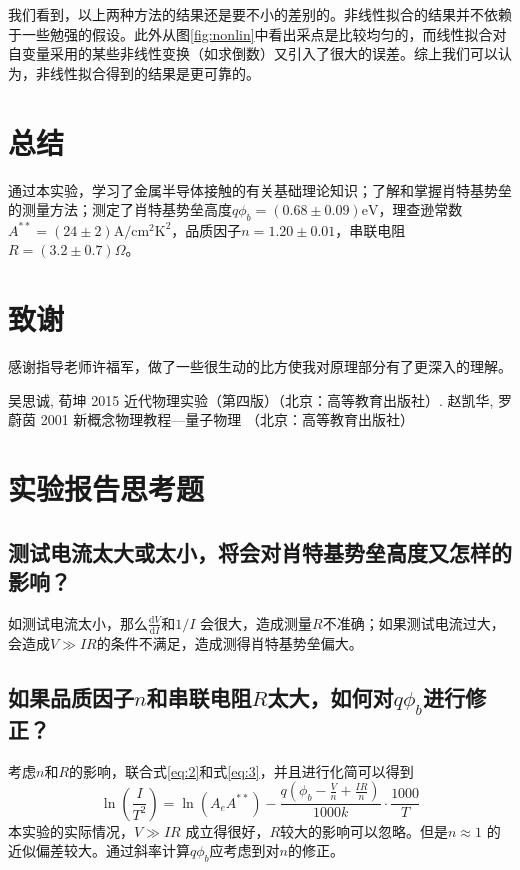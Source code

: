 \documentclass[aps,pre,12pt,preprint,onecolumn,showpacs,showkeys]{revtex4-1}
\def \d {\mathrm d}
\begin{document}
        我们看到，以上两种方法的结果还是要不小的差别的。非线性拟合的结果并不依赖于一些勉强的假设。此外从图\ref{fig:nonlin}中看出采点是比较均匀的，而线性拟合对自变量采用的某些非线性变换（如求倒数）又引入了很大的误差。综上我们可以认为，非线性拟合得到的结果是更可靠的。

\section{总结}
    通过本实验，学习了金属半导体接触的有关基础理论知识；了解和掌握肖特基势垒的测量方法；测定了肖特基势垒高度$q \phi_b=(0.68\pm 0.09)\mathrm{eV}$，理查逊常数$A^{**}=(24\pm 2)\mathrm{A/cm^2 K^2}$，品质因子$n=1.20 \pm 0.01$，串联电阻$R=(3.2 \pm 0.7) \Omega$。
\section{致谢}
    感谢指导老师许福军，做了一些很生动的比方使我对原理部分有了更深入的理解。

\begin{thebibliography}{}
     吴思诚, 荀坤 2015 近代物理实验（第四版）（北京：高等教育出版社）.
     赵凯华, 罗蔚茵 2001 新概念物理教程—量子物理 （北京：高等教育出版社）
\end{thebibliography}

\clearpage
\appendix
\section{实验报告思考题}
    \subsection{测试电流太大或太小，将会对肖特基势垒高度又怎样的影响？}
        如测试电流太小，那么$\frac{\d V}{\d I}$和$1/I$ 会很大，造成测量$R$不准确；如果测试电流过大，会造成$V\gg IR$的条件不满足，造成测得肖特基势垒偏大。
    \subsection{如果品质因子$n$和串联电阻$R$太大，如何对$q\phi_b$进行修正？}
        考虑$n$和$R$的影响，联合式\ref{eq:2}和式\ref{eq:3}，并且进行化简可以得到
        \begin{equation}
            \ln\left(\frac{I}{T^2}\right)=\ln (A_e A^{**}) -\frac{q\left(\phi_b - \frac{V}{n}+\frac{IR}{n}\right)}{1000k}\cdot\frac{1000}{T}
        \end{equation}
        本实验的实际情况，$V\gg IR$ 成立得很好，$R$较大的影响可以忽略。但是$n\approx 1$ 的近似偏差较大。通过斜率计算$q\phi_b$应考虑到对$n$的修正。
\end{document}
